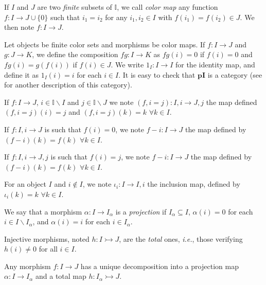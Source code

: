 \documentclass[english]{PaperTools/latex/lipics}
\def\pI{\ensuremath{\mathbf{pI}}}
\def\ie{\textit{i.e.}}
\begin{document}
\begin{definition}
  If $I$ and $J$ are two \emph{finite} subsets of $𝕀$, we call
  \emph{color map} any function $f : I → J ∪ \{0\}$ such that
  $i_1 = i_2$ for any $i_1, i_2 ∈ I$ with $f(i_1) = f(i_2) ∈ J$.
  We then note $f : I → J$.
\end{definition}

\begin{definition}[Category $\pI{}$]
  \label{def:pI}
  Let objects be finite color sets and morphisms be color maps.
  If $f : I → J$ and $g : J → K$, we define the composition $fg : I → K$
  as $fg(i) = 0$ if $f(i) = 0$ and $fg(i) = g(f(i))$ if $f(i) ∈ J$.
  We write $1_I : I → I$ for the identity map, and define it as $1_I(i) = i$ for each $i ∈ I$.
  It is easy to check that \pI{} is a category (see \cite[ex.~9.7
  p.~176]{PittsAM:nomsns} for another description of this category).
\end{definition}

If $f : I → J$, $i ∈ 𝕀 \backslash I$ and $j ∈ 𝕀 \backslash J$ we note
$(f, i = j) : I,i → J,j$ the map defined $(f,i=j)(i) = j$ and
$(f,i=j)(k) = k$ $∀ k ∈ I$.

If $f : I,i → J$ is such that $f(i) = 0$, we note $f-i : I → J$ the map
defined by $(f-i)(k) = f(k)$ $∀ k ∈ I$.

If $f : I,i → J,j$ is such that $f(i) = j$, we note $f-i : I → J$ the map
defined by $(f-i)(k) = f(k)$ $∀ k ∈ I$.

For an object $I$ and $i ∉ I$, we note $ι_i : I → I,i$ the inclusion
map, defined by $ι_i(k) = k$ $∀ k ∈ I$.

\begin{definition}[Projection]
   We say that a morphism $α : I → I_α$ is a \emph{projection} if
   $I_α ⊆ I$,
   $α(i) = 0$ for each $i ∈ I \backslash I_α$, and
   $α(i) = i$ for each $i ∈ I_α$.
\end{definition}
\begin{definition}
  Injective morphisms, noted $h : I ↣ J$, are the \emph{total} ones, \ie,
  those verifying $h(i) ≠ 0$ for all $i ∈ I$.
\end{definition}
\begin{remark}
  Any morphism $f : I → J$ has a
  unique decomposition into a projection map
  $α : I → I_α$ and a total map $h : I_α ↣ J$.
\end{remark}
\end{document}

